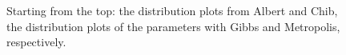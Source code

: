 \documentclass{article}
\begin{document}
\begin{figure}[h!]
    \caption{Starting from the top: the distribution plots from Albert and Chib, the distribution plots of the parameters with Gibbs and Metropolis, respectively.}
    \label{fig:dist}
\end{figure}



\end{document}
